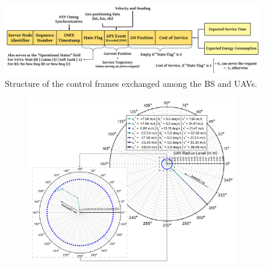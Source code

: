 \documentclass[10pt,twocolumn]{IEEEtran}
\begin{document}
\begin{figure} [t]
     \centering
     \includegraphics[width=1.0\linewidth]{figs/Control_Frame_Design.png}
     \vspace{-5mm}
     \caption{Structure of the control frames exchanged among the BS and UAVs.}
     \vspace{-7mm}
     \label{F6}
\end{figure}
\begin{figure} [t]
     \begin{subfigure}{0.5\linewidth}
         \centering
         \includegraphics[width=1.0\linewidth]{figs/Waiting_Policy_1Mb.png}
         \vspace{-4mm}
         \label{F7}
     \end{subfigure}
     \begin{subfigure}{0.5\linewidth}
         \centering

\end{subfigure}
\end{figure}
\end{document}
